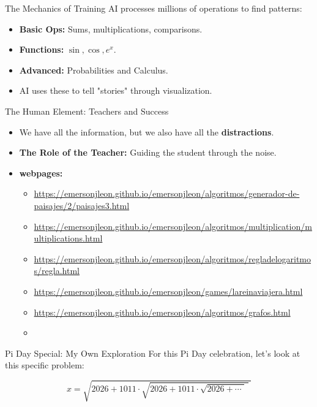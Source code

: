 \documentclass{beamer}
\begin{document}
\begin{frame}{The Mechanics of Training}
    AI processes millions of operations to find patterns:
    \begin{itemize}
        \item \textbf{Basic Ops:} Sums, multiplications, comparisons.
        \item \textbf{Functions:} $\sin, \cos, e^x$.
        \item \textbf{Advanced:} Probabilities and Calculus.
        \item AI uses these to tell "stories" through visualization.
    \end{itemize}
\end{frame}

\begin{frame}{The Human Element: Teachers and Success}
    \begin{itemize}
        \item We have all the information, but we also have all the \textbf{distractions}.
        \item \textbf{The Role of the Teacher:} Guiding the student through the noise.
        \item \textbf{webpages:} 
            \begin{itemize}
                \item \url{https://emersonjleon.github.io/emersonjleon/algoritmos/generador-de-paisajes/2/paisajes3.html}
                \item \url{https://emersonjleon.github.io/emersonjleon/algoritmos/multiplication/multiplications.html}
                \item \url{https://emersonjleon.github.io/emersonjleon/algoritmos/regladelogaritmos/regla.html}
                \item \url{https://emersonjleon.github.io/emersonjleon/games/lareinaviajera.html}
                \item \url{https://emersonjleon.github.io/emersonjleon/algoritmos/grafos.html}
                \item \url{}
                  
            \end{itemize}
    \end{itemize}
\end{frame}

\begin{frame}{Pi Day Special: My Own Exploration}
    For this Pi Day celebration, let's look at this specific problem:
    \vfill
    \begin{center}
        
\[
     x =  \sqrt{2026 + 1011 \cdot \sqrt{2026 + 1011 \cdot \sqrt{2026  + \cdots \phantom{.}}\phantom{.}}\phantom{.}}
\]
    \end{center}
    \vfill
\end{frame}
\end{document}
